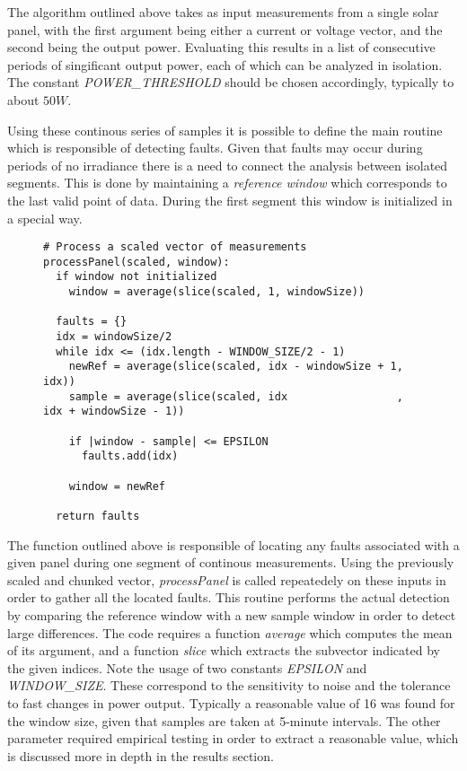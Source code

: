 The algorithm outlined above takes as input measurements from a single solar panel, with the first argument being either a current or voltage vector, and the second being the output power.
Evaluating this results in a list of consecutive periods of singificant output power, each of which can be analyzed in isolation.
The constant \emph{POWER\_THRESHOLD} should be chosen accordingly, typically to about $50 W$.

Using these continous series of samples it is possible to define the main routine which is responsible of detecting faults.
Given that faults may occur during periods of no irradiance there is a need to connect the analysis between isolated segments.
This is done by maintaining a \emph{reference window} which corresponds to the last valid point of data.
During the first segment this window is initialized in a special way.

\begin{figure}[H]
\begin{verbatim}
# Process a scaled vector of measurements
processPanel(scaled, window):
  if window not initialized
    window = average(slice(scaled, 1, windowSize))

  faults = {}
  idx = windowSize/2
  while idx <= (idx.length - WINDOW_SIZE/2 - 1)
    newRef = average(slice(scaled, idx - windowSize + 1, idx))
    sample = average(slice(scaled, idx                 , idx + windowSize - 1))

    if |window - sample| <= EPSILON
      faults.add(idx)

    window = newRef

  return faults
\end{verbatim}
\end{figure}

The function outlined above is responsible of locating any faults associated with a given panel during one segment of continous measurements.
Using the previously scaled and chunked vector, \emph{processPanel} is called repeatedely on these inputs in order to gather all the located faults.
This routine performs the actual detection by comparing the reference window with a new sample window in order to detect large differences.
The code requires a function \emph{average} which computes the mean of its argument, and a function \emph{slice} which extracts the subvector indicated by the given indices.
Note the usage of two constants \emph{EPSILON} and \emph{WINDOW\_SIZE}.
These correspond to the sensitivity to noise and the tolerance to fast changes in power output.
Typically a reasonable value of 16 was found for the window size, given that samples are taken at 5-minute intervals.
The other parameter required empirical testing in order to extract a reasonable value, which is discussed more in depth in the results section.

